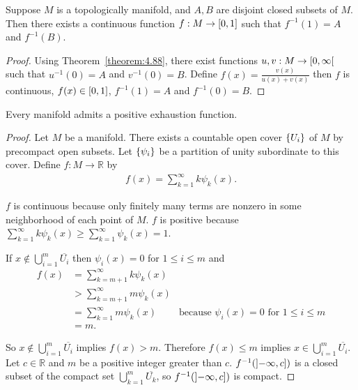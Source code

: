 \begin{corollary}{4.89}
	Suppose $M$ is a topologically manifold, and $A, B$ are disjoint closed subsets of $M$. Then there exists a continuous function $f: M\to \left[{0,1}\right]$ such that $f^{-1}(1) = A$ and $f^{-1}(B)$.
\end{corollary}

\begin{proof}
	Using Theorem~\ref{theorem:4.88}, there exist functions $u, v: M \to \left[{0, \infty}\right[$ such that $u^{-1}(0) = A$ and $v^{-1}(0) = B$. Define $f(x) = \frac{v(x)}{u(x) + v(x)}$ then $f$ is continuous, $f(x) \in \left[{0, 1}\right]$, $f^{-1}(1) = A$ and $f^{-1}(0) = B$.
\end{proof}

\begin{theorem}{4.90}
	Every manifold admits a positive exhaustion function.
\end{theorem}

\begin{proof}
	Let $M$ be a manifold. There exists a countable open cover $\left\{{U_{i}}\right\}$ of $M$ by precompact open subsets. Let $\left\{{\psi_{i}}\right\}$ be a partition of unity subordinate to this cover. Define $f: M\to \mathbb{R}$ by
	\begin{align*}
		f(x) = \sum^{\infty}_{k=1}k\psi_{k}(x).
	\end{align*}

	$f$ is continuous because only finitely many terms are nonzero in some neighborhood of each point of $M$. $f$ is positive because $\sum^{\infty}_{k=1}k\psi_{k}(x) \geq \sum^{\infty}_{k=1}\psi_{k}(x) = 1$.

	If $x\notin \bigcup^{m}_{i=1}\overline{U_{i}}$ then $\psi_{i}(x) = 0$ for $1\leq i\leq m$ and
	\begin{align*}
		f(x) & = \sum^{\infty}_{k=m+1}k\psi_{k}(x)                                                        \\
		     & > \sum^{\infty}_{k=m+1}m\psi_{k}(x)                                                        \\
		     & = \sum^{\infty}_{k=1}m\psi_{k}(x)   & \text{because $\psi_{i}(x) = 0$ for $1\leq i\leq m$} \\
		     & = m.
	\end{align*}

	So $x\notin \bigcup^{m}_{i=1}\overline{U_{i}}$ implies $f(x) > m$. Therefore $f(x) \leq m$ implies $x \in \bigcup^{m}_{i=1}\overline{U_{i}}$. Let $c\in \mathbb{R}$ and $m$ be a positive integer greater than $c$. $f^{-1}(\left]{-\infty, c}\right])$ is a closed subset of the compact set $\bigcup_{k=1}^{m}\overline{U_{k}}$, so $f^{-1}(\left]{-\infty, c}\right])$ is compact.
\end{proof}

